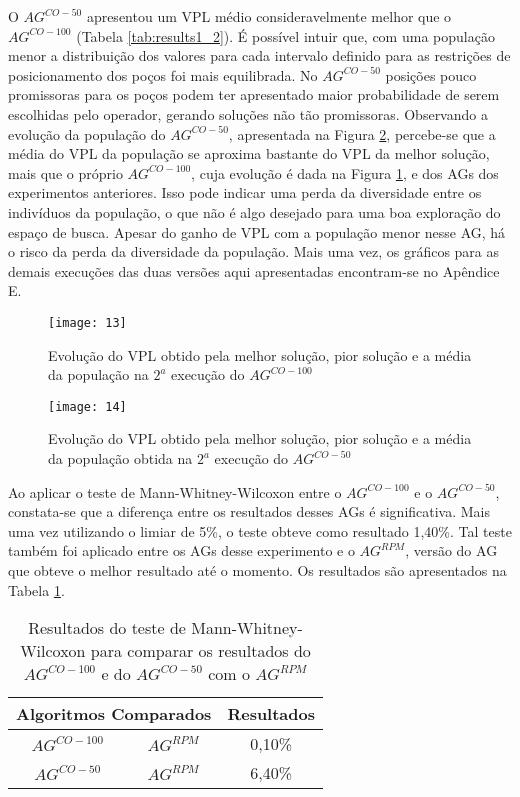 O $AG^{CO-{50}}$ apresentou um VPL médio consideravelmente melhor que o $AG^{CO-{100}}$ (Tabela \ref{tab:results1_2}). É possível intuir que, com uma população menor a distribuição dos valores para cada intervalo definido para as restrições de posicionamento dos poços foi mais equilibrada. No $AG^{CO-{50}}$ posições pouco promissoras para os poços podem ter apresentado maior probabilidade de serem escolhidas pelo operador, gerando soluções não tão promissoras. Observando a evolução da população do $AG^{CO-{50}}$, apresentada na Figura \ref{fig:graph5_2}, percebe-se que a média do VPL da população se aproxima bastante do VPL da melhor solução, mais que o próprio $AG^{CO-{100}}$, cuja evolução é dada na Figura \ref{fig:graph5_1}, e dos AGs dos experimentos anteriores. Isso pode indicar uma perda da diversidade entre os indivíduos da população, o que não é algo desejado para uma boa exploração do espaço de busca. Apesar do ganho de VPL com a população menor nesse AG, há o risco da perda da diversidade da população. Mais uma vez, os gráficos para as demais execuções das duas versões aqui apresentadas encontram-se no Apêndice E.

\begin{figure}[H]
\centering
\texttt{[image: 13]}
\caption{Evolução do VPL obtido pela melhor solução, pior solução e a média da população na $2^a$ execução do $AG^{CO-{100}}$}
\label{fig:graph5_1}
\end{figure}

\begin{figure}[H]
\centering
\texttt{[image: 14]}
\caption{Evolução do VPL obtido pela melhor solução, pior solução e a média da população obtida na $2^a$ execução do $AG^{CO-{50}}$}
\label{fig:graph5_2}
\end{figure}

Ao aplicar o teste de Mann-Whitney-Wilcoxon entre o $AG^{CO-{100}}$ e o $AG^{CO-{50}}$, constata-se que a diferença entre os resultados desses AGs é significativa. Mais uma vez utilizando o limiar de 5\%, o teste obteve como resultado 1,40\%.  Tal teste também foi aplicado entre os AGs desse experimento e o $AG^{RPM}$, versão do AG que obteve o melhor resultado até o momento. Os resultados são apresentados na Tabela \ref{tab:mw5_1}.

\begin{table}[H]
\centering
\caption{Resultados do teste de Mann-Whitney-Wilcoxon para comparar os resultados do $AG^{CO-{100}}$ e do $AG^{CO-{50}}$ com o $AG^{RPM}$}
\label{tab:mw5_1}
\begin{tabular}{|c|c|c|}
\hline
\multicolumn{2}{|c|}{Algoritmos Comparados} & Resultados \\ \hline
$AG^{CO-{100}}$ & $AG^{RPM}$ & 0,10\% \\ \hline
$AG^{CO-{50}}$ & $AG^{RPM}$ & 6,40\% \\ \hline

\end{tabular}
\end{table}

